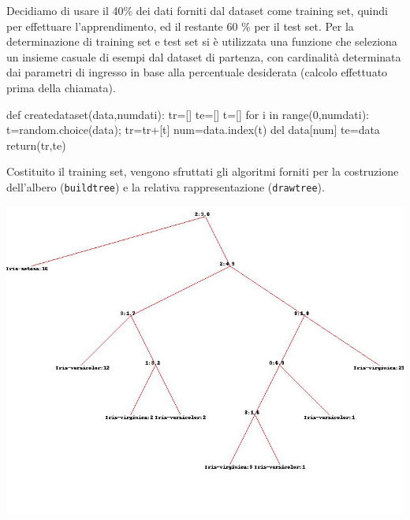 			Decidiamo di usare il 40\% dei dati forniti dal dataset come training set, quindi per effettuare l'apprendimento, ed il restante 60 \% per il test set. Per la determinazione di training set e test set si è utilizzata una funzione che seleziona un insieme casuale di esempi dal dataset di partenza, con cardinalità determinata dai parametri di ingresso in base alla percentuale desiderata (calcolo effettuato prima della chiamata).
			\bigskip
			\begin{python}
		def createdataset(data,numdati):
			tr=[]
			te=[]
			t=[]
			for i in range(0,numdati):
				t=random.choice(data);
				tr=tr+[t]
				num=data.index(t)
				del data[num]
			te=data
			return(tr,te)
			\end{python}
			\bigskip
			Costituito il training set, vengono sfruttati gli algoritmi forniti per la costruzione dell'albero (\texttt{buildtree}) e la relativa rappresentazione (\texttt{drawtree}).
		
			\includegraphics[scale=0.55]{iris.jpg}
		
